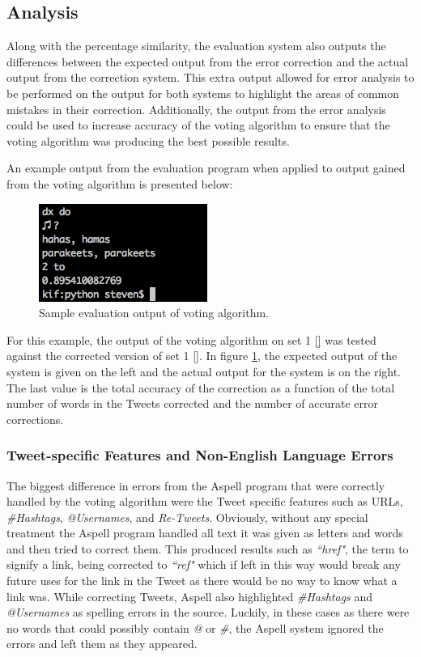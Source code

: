 \subsection{Analysis}
\label{analysisT}
Along with the percentage similarity, the evaluation system also outputs the differences between the expected output from the error correction and the actual output from the correction system. This extra output allowed for error analysis to be performed on the output for both systems to highlight the areas of common mistakes in their correction. Additionally, the output from the error analysis could be used to increase accuracy of the voting algorithm to ensure that the voting algorithm was producing the best possible results.

An example output from the evaluation program when applied to output gained from the voting algorithm is presented below:
\begin{figure}[H]
	\centering
	\label{fig:output}
	\includegraphics{images/sampleoutput}
	\caption{Sample evaluation output of voting algorithm.}
\end{figure}

For this example, the output of the voting algorithm on set 1 \ref{} was tested against the corrected version of set 1 \ref{}. In figure \ref{fig:output}, the expected output of the system is given on the left and the actual output for the system is on the right. The last value is the total accuracy of the correction as a function of the total number of words in the Tweets corrected and the number of accurate error corrections.

\subsubsection*{Tweet-specific Features and Non-English Language Errors}
The biggest difference in errors from the Aspell program that were correctly handled by the voting algorithm were the Tweet specific features such as URLs, \emph{#Hashtags}, \emph{@Usernames}, and \emph{Re-Tweets}. Obviously, without any special treatment the Aspell program handled all text it was given as letters and words and then tried to correct them. This produced results such as \emph{``href"}, the term to signify a link, being corrected to \emph{``ref"} which if left in this way would break any future uses for the link in the Tweet as there would be no way to know what a link was. While correcting Tweets, Aspell also highlighted \emph{\#Hashtags} and \emph{@Usernames} as spelling errors in the source. Luckily, in these cases as there were no words that could possibly contain \emph{@} or \emph{\#}, the Aspell system ignored the errors and left them as they appeared.

